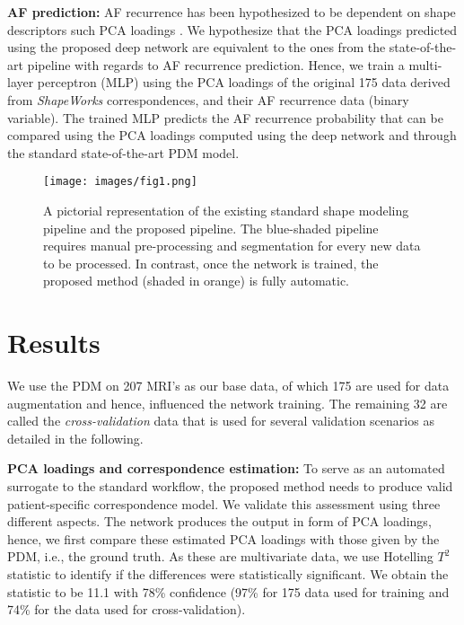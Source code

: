 \documentclass[twocolumn]{cinc}
\begin{document}
\vspace{0.05in}
\noindent\textbf{AF prediction: }
AF recurrence has been hypothesized to be dependent on shape descriptors such PCA loadings \cite{marrouche2014decaaf}. We hypothesize that the PCA loadings predicted using the proposed deep network are equivalent to the ones from the state-of-the-art pipeline with regards to AF recurrence prediction. Hence, we train a multi-layer perceptron (MLP) using the PCA loadings of the original 175 data derived from \emph{ShapeWorks} correspondences, and their AF recurrence data (binary variable). The trained MLP predicts the AF recurrence probability that can be compared using the PCA loadings computed using the deep network and through the standard state-of-the-art PDM model. 


\begin{figure}[!h]
\centering
\texttt{[image: images/fig1.png]}
\vspace{-0.1in}
\caption{A pictorial representation of the existing standard shape modeling pipeline and the proposed pipeline. The blue-shaded pipeline requires manual pre-processing and segmentation for every new data to be processed. In contrast, once the network is trained, the proposed method (shaded in orange) is fully automatic.}
\vspace{-0.2in}
\label{fig:trainmodel}
\end{figure}


\vspace{-0.1in}
\section{Results}
\vspace{-0.1in}

We use the PDM on 207 MRI's as our base data, of which 175 are used for data augmentation and hence, influenced the network training. The remaining 32 are called the \emph{cross-validation} data that is used for several validation scenarios as detailed in the following.

\vspace{0.05in}
\noindent\textbf{PCA loadings and correspondence estimation: }
To serve as an automated surrogate to the standard workflow, the proposed method needs to produce valid patient-specific correspondence model. We validate this assessment using three different aspects. The network produces the output in form of PCA loadings, hence, we first compare these estimated PCA loadings with those given by the PDM, i.e., the ground truth. As these are multivariate data, we use Hotelling $T^2$ statistic to identify if the differences were statistically significant. We obtain the statistic to be 11.1 with 78\% confidence (97\% for 175 data used for training and 74\% for the data used for cross-validation). 
\end{document}
